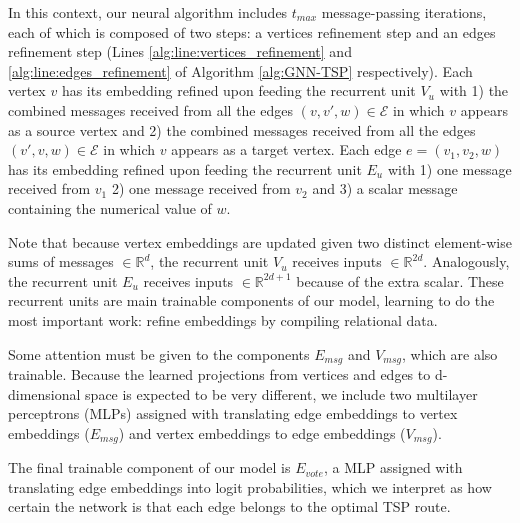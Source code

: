 \documentclass{article}
\begin{document}
In this context, our neural algorithm includes $t_{max}$ message-passing iterations, each of which is composed of two steps: a vertices refinement step and an edges refinement step (Lines \ref{alg:line:vertices_refinement} and \ref{alg:line:edges_refinement} of Algorithm \ref{alg:GNN-TSP} respectively). Each vertex $v$ has its embedding refined upon feeding the recurrent unit $V_u$ with 1) the combined messages received from all the edges $(v,v',w) \in \mathcal{E}$ in which $v$ appears as a source vertex and 2) the combined messages received from all the edges $(v',v,w) \in \mathcal{E}$ in which $v$ appears as a target vertex. Each edge $e = (v_1, v_2, w)$ has its embedding refined upon feeding the recurrent unit $E_u$ with 1) one message received from $v_1$ 2) one message received from $v_2$ and 3) a scalar message containing the numerical value of $w$.

Note that because vertex embeddings are updated given two distinct element-wise sums of messages $\in \mathbb{R}^d$, the recurrent unit $V_u$ receives inputs $\in \mathbb{R}^{2d}$. Analogously, the recurrent unit $E_u$ receives inputs $\in \mathbb{R}^{2d+1}$ because of the extra scalar. These recurrent units are main trainable components of our model, learning to do the most important work: refine embeddings by compiling relational data.

Some attention must be given to the components $E_{msg}$ and $V_{msg}$, which are also trainable. Because the learned projections from vertices and edges to d-dimensional space is expected to be very different, we include two multilayer perceptrons (MLPs) assigned with translating edge embeddings to vertex embeddings ($E_{msg}$) and vertex embeddings to edge embeddings ($V_{msg}$).

The final trainable component of our model is $E_{vote}$, a MLP assigned with translating edge embeddings into logit probabilities, which we interpret as how certain the network is that each edge belongs to the optimal TSP route.
\end{document}

